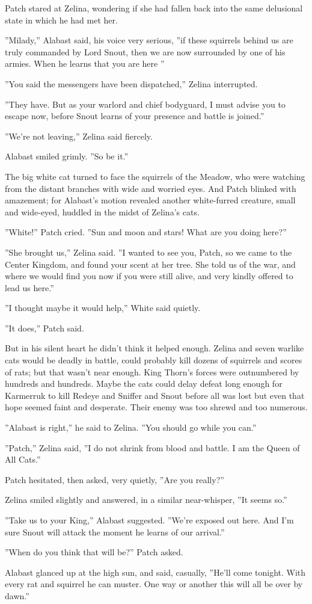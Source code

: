 \documentclass[12pt]{book}
\begin{document}
 Patch stared at Zelina, wondering if she had fallen back into the same delusional state in which he had met her.\par
 ''Milady,'' Alabast said, his voice very serious, ''if these squirrels behind us are truly commanded by Lord Snout, then we are now surrounded by one of his armies. When he learns that you are here %
''\par
 ''You said the messengers have been dispatched,'' Zelina interrupted.\par
 ''They have. But as your warlord and chief bodyguard, I must advise you to escape now, before Snout learns of your presence and battle is joined.''\par
 ''We're not leaving,'' Zelina said fiercely.\par
 Alabast smiled grimly. ''So be it.''\par
 The big white cat turned to face the squirrels of the Meadow, who were watching from the distant branches with wide and worried eyes. And Patch blinked with amazement; for Alabast's motion revealed another white-furred creature, small and wide-eyed, huddled in the midst of Zelina's cats.\par
 ''White!'' Patch cried. ''Sun and moon and stars! What are you doing here?''\par
 ''She brought us,'' Zelina said. ''I wanted to see you, Patch, so we came to the Center Kingdom, and found your scent at her tree. She told us of the war, and where we would find you now if you were still alive, and very kindly offered to lead us here.''\par
 ''I thought maybe it would help,'' White said quietly.\par
 ''It does,'' Patch said.\par
 But in his silent heart he didn't think it helped enough. Zelina and seven warlike cats would be deadly in battle, could probably kill dozens of squirrels and scores of rats; but that wasn't near enough. King Thorn's forces were outnumbered by hundreds and hundreds. Maybe the cats could delay defeat long enough for Karmerruk to kill Redeye and Sniffer and Snout before all was lost %
 but even that hope seemed faint and desperate. Their enemy was too shrewd and too numerous.\par
 ''Alabast is right,'' he said to Zelina. ''You should go while you can.''\par
 ''Patch,'' Zelina said, ''I do not shrink from blood and battle. I am the Queen of All Cats.''\par
 Patch hesitated, then asked, very quietly, ''Are you really?''\par
 Zelina smiled slightly and answered, in a similar near-whisper, ''It seems so.''\par
 ''Take us to your King,'' Alabast suggested. ''We're exposed out here. And I'm sure Snout will attack the moment he learns of our arrival.''\par
 ''When do you think that will be?'' Patch asked.\par
 Alabast glanced up at the high sun, and said, casually, ''He'll come tonight. With every rat and squirrel he can muster. One way or another this will all be over by dawn.''\par
\end{document}
